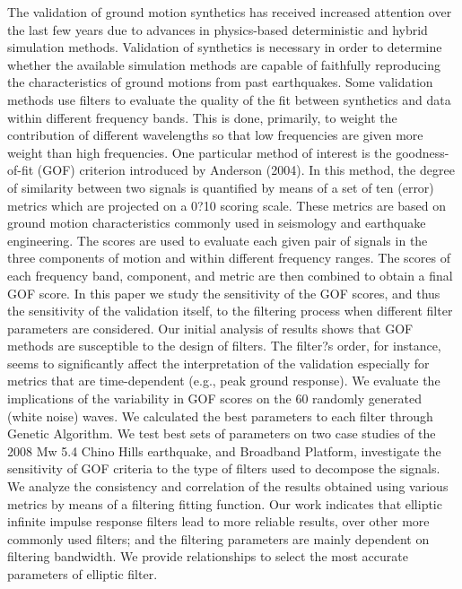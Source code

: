 
The validation of ground motion synthetics has received increased attention over the last few years due to advances in physics-based deterministic and hybrid simulation methods. Validation of synthetics is necessary in order to determine whether the available simulation methods are capable of faithfully reproducing the characteristics of ground motions from past earthquakes. Some validation methods use filters to evaluate the quality of the fit between synthetics and data within different frequency bands. This is done, primarily, to weight the contribution of different wavelengths so that low frequencies are given more weight than high frequencies. One particular method of interest is the goodness-of-fit (GOF) criterion introduced by Anderson (2004). In this method, the degree of similarity between two signals is quantified by means of a set of ten (error) metrics which are projected on a 0?10 scoring scale. These metrics are based on ground motion characteristics commonly used in seismology and earthquake engineering. The scores are used to evaluate each given pair of signals in the three components of motion and within different frequency ranges. The scores of each frequency band, component, and metric are then combined to obtain a final GOF score. In this paper we study the sensitivity of the GOF scores, and thus the sensitivity of the validation itself, to the filtering process when different filter parameters are considered. Our initial analysis of results shows that GOF methods are susceptible to the design of filters. The filter?s order, for instance, seems to significantly affect the interpretation of the validation especially for metrics that are time-dependent (e.g., peak ground response). We evaluate the implications of the variability in GOF scores on the 60 randomly generated (white noise) waves. We calculated the best parameters to each filter through Genetic Algorithm. We test best sets of parameters on two case studies of the 2008 Mw 5.4 Chino Hills earthquake, and Broadband Platform, investigate the sensitivity of GOF criteria to the type of filters used to decompose the signals. We analyze the consistency and correlation of the results obtained using various metrics by means of a filtering fitting function. Our work indicates that elliptic infinite impulse response filters lead to more reliable results, over other more commonly used filters; and the filtering parameters are mainly dependent on filtering bandwidth. We provide relationships to select the most accurate parameters of elliptic filter.

